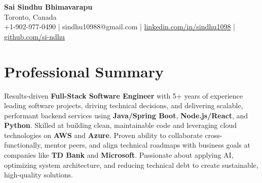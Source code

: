 \documentclass[letterpaper,11pt]{article}
\begin{document}
\begin{center}
  {\Large \textbf{Sai Sindhu Bhimavarapu}} \\
  Toronto, Canada \\
  +1-902-977-0490 \enspace | \enspace sindhu10988@gmail.com \enspace | \enspace \href{https://www.linkedin.com/in/sindhu1098/}{linkedin.com/in/sindhu1098} \enspace | \enspace \href{https://github.com/si-ndhu}{github.com/si-ndhu}
\end{center}

\section{Professional Summary}
  \begin{itemize}[leftmargin=0.15in, label={}]
    \small{\item{
     Results-driven \textbf{Full-Stack Software Engineer} with 5+ years of experience leading software projects, driving technical decisions, and delivering scalable, performant backend services using \textbf{Java/Spring Boot}, \textbf{Node.js/React}, and \textbf{Python}. Skilled at building clean, maintainable code and leveraging cloud technologies on \textbf{AWS} and \textbf{Azure}. Proven ability to collaborate cross-functionally, mentor peers, and align technical roadmaps with business goals at companies like \textbf{TD Bank} and \textbf{Microsoft}. Passionate about applying AI, optimizing system architecture, and reducing technical debt to create sustainable, high-quality solutions.
    }}
  \end{itemize}
\vspace{-16pt}

\end{document}
